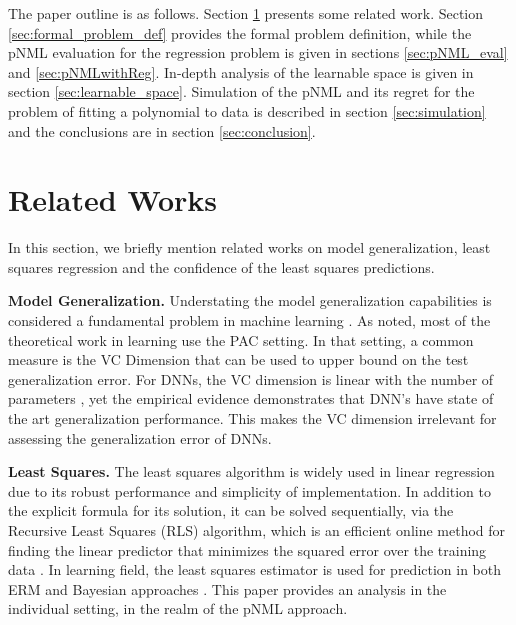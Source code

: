 \documentclass[conference,letterpaper]{IEEEtran}
\begin{document}
The paper outline is as follows.
Section \ref{sec:related_works} presents some related work. 
Section \ref{sec:formal_problem_def} provides the formal problem definition, while the pNML evaluation for the regression problem is given in sections \ref{sec:pNML_eval} and \ref{sec:pNMLwithReg}. 
In-depth analysis of the learnable space is given in section \ref{sec:learnable_space}. 
Simulation of the pNML and its regret for the problem of fitting a polynomial to data is described in section \ref{sec:simulation} and the conclusions are in section \ref{sec:conclusion}.

\section{Related Works} \label{sec:related_works}
In this section, we briefly mention related works on model generalization, least squares regression and the confidence of the least squares predictions.

\textbf{Model Generalization.} 
Understating the model generalization capabilities is considered a fundamental problem in machine learning  \cite{vapnik2013nature}. 
As noted, most of the theoretical work in learning use the PAC setting. In that setting, a common measure is the VC Dimension that can be used to upper bound on the test generalization error.
For DNNs, the VC dimension is linear with the number of parameters \cite{sontag1998vc}, yet the empirical evidence demonstrates that DNN's have state of the art generalization performance. This makes the VC dimension irrelevant for assessing the generalization error of DNNs.

\textbf{Least Squares.}
The least squares algorithm is widely used in linear regression due to its robust performance and simplicity of implementation.
In addition to the explicit formula for its solution, it can be solved sequentially, via the Recursive Least Squares (RLS) algorithm, which is an efficient online method for finding the linear predictor that minimizes the squared error over the training data \cite{hayes19969}.
In learning field, the least squares estimator is used for prediction in both ERM and Bayesian approaches \cite{fornalski2015applications}. 
This paper provides an analysis in the individual setting, in the realm of the pNML approach.
\end{document}
